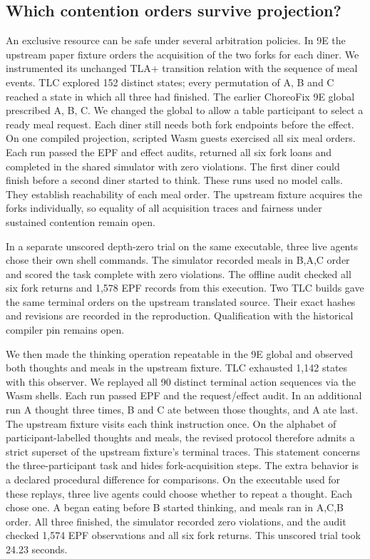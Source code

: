 \documentclass[10pt]{article}
\begin{document}
\subsection{Which contention orders survive projection?}
An exclusive resource can be safe under several arbitration policies. In 9E the
upstream paper fixture orders the acquisition of the two forks for each diner.
We instrumented its unchanged TLA+ transition relation with the sequence of
meal events. TLC explored 152 distinct states; every permutation of A, B and C
reached a state in which all three had finished. The earlier ChoreoFix 9E global prescribed A, B, C. We changed the global to allow a table participant to select a ready meal request. Each diner still needs both fork endpoints before the effect. On one compiled projection, scripted Wasm guests exercised all six meal orders. Each run passed the EPF and effect audits, returned all six fork loans and completed in the shared simulator with zero violations. The first diner could finish before a second diner started to think. These runs used no model calls. They establish reachability of each meal order. The upstream fixture acquires the forks individually, so equality of all acquisition traces and fairness under sustained contention remain open.

In a separate unscored depth-zero trial on the same executable, three live
agents chose their own shell commands. The simulator recorded meals in B,A,C
order and scored the task complete with zero violations. The offline audit
checked all six fork returns and 1,578 EPF records from this execution.
Two TLC builds gave the same terminal orders on the upstream translated source. Their exact hashes and revisions are recorded in the reproduction. Qualification with the historical compiler pin remains open.

We then made the thinking operation repeatable in the 9E global and observed
both thoughts and meals in the upstream fixture. TLC exhausted 1,142 states
with this observer. We replayed all 90 distinct terminal action sequences via
the Wasm shells. Each run passed EPF and the request/effect audit. In an
additional run A thought three times, B and C ate between those thoughts, and
A ate last. The upstream fixture visits each think instruction once. On the
alphabet of participant-labelled thoughts and meals, the revised protocol
therefore admits a strict superset of the upstream fixture's terminal traces.
This statement concerns the three-participant task and hides fork-acquisition
steps. The extra behavior is a declared procedural difference for comparisons.
On the executable used for these replays, three live agents could choose
whether to repeat a thought. Each chose one. A began eating before B started
thinking, and meals ran in A,C,B order. All three finished, the simulator
recorded zero violations, and the audit checked 1,574 EPF observations and all
six fork returns. This unscored trial took 24.23 seconds.
\end{document}
